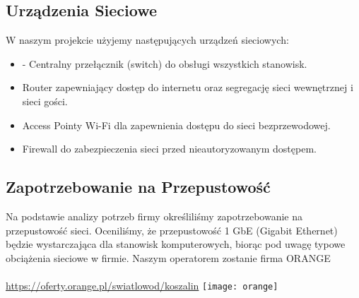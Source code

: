 \subsection{Urządzenia Sieciowe}
    W naszym projekcie użyjemy następujących urządzeń sieciowych:
    \begin{itemize}
        \item - Centralny przełącznik (switch) do obsługi wszystkich stanowisk.
        \item Router zapewniający dostęp do internetu oraz segregację sieci wewnętrznej i sieci gości.
        \item Access Pointy Wi-Fi dla zapewnienia dostępu do sieci bezprzewodowej.
        \item Firewall do zabezpieczenia sieci przed nieautoryzowanym dostępem.
    \end{itemize}



\subsection{Zapotrzebowanie na Przepustowość}

    Na podstawie analizy potrzeb firmy określiliśmy zapotrzebowanie na przepustowość sieci. Oceniliśmy, że przepustowość 1 GbE (Gigabit Ethernet) będzie wystarczająca dla stanowisk komputerowych, biorąc pod uwagę typowe obciążenia sieciowe w firmie. 
    Naszym operatorem zostanie firma ORANGE\\ \\
    \url{https://oferty.orange.pl/swiatlowod/koszalin}
    \texttt{[image: orange]} \\
